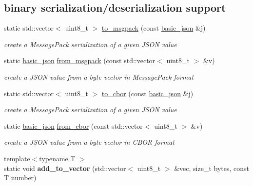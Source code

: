 \subsection*{binary serialization/deserialization support}
\begin{DoxyCompactItemize}
\item 
static std\+::vector$<$ uint8\+\_\+t $>$ \hyperlink{classnlohmann_1_1basic__json_a3ac608b8f63761a73b4fc0d2312d77b5}{to\+\_\+msgpack} (const \hyperlink{classnlohmann_1_1basic__json}{basic\+\_\+json} \&j)
\begin{DoxyCompactList}\small\item\em create a Message\+Pack serialization of a given J\+S\+O\+N value \end{DoxyCompactList}\item 
static \hyperlink{classnlohmann_1_1basic__json}{basic\+\_\+json} \hyperlink{classnlohmann_1_1basic__json_a2efa0d7ddd2bb73d382ad08f153838c3}{from\+\_\+msgpack} (const std\+::vector$<$ uint8\+\_\+t $>$ \&v)
\begin{DoxyCompactList}\small\item\em create a J\+S\+O\+N value from a byte vector in Message\+Pack format \end{DoxyCompactList}\item 
static std\+::vector$<$ uint8\+\_\+t $>$ \hyperlink{classnlohmann_1_1basic__json_a98b7780376d6b23fb04bd3cb29594b4b}{to\+\_\+cbor} (const \hyperlink{classnlohmann_1_1basic__json}{basic\+\_\+json} \&j)
\begin{DoxyCompactList}\small\item\em create a Message\+Pack serialization of a given J\+S\+O\+N value \end{DoxyCompactList}\item 
static \hyperlink{classnlohmann_1_1basic__json}{basic\+\_\+json} \hyperlink{classnlohmann_1_1basic__json_a832e482e6248823977628fefa3d780d1}{from\+\_\+cbor} (const std\+::vector$<$ uint8\+\_\+t $>$ \&v)
\begin{DoxyCompactList}\small\item\em create a J\+S\+O\+N value from a byte vector in C\+B\+O\+R format \end{DoxyCompactList}\item 
\hypertarget{classnlohmann_1_1basic__json_a6752f0bdeba222e854823d1a40d76830}{}{\footnotesize template$<$typename T $>$ }\\static void {\bfseries add\+\_\+to\+\_\+vector} (std\+::vector$<$ uint8\+\_\+t $>$ \&vec, size\+\_\+t bytes, const T number)\label{classnlohmann_1_1basic__json_a6752f0bdeba222e854823d1a40d76830}


\end{DoxyCompactItemize}
